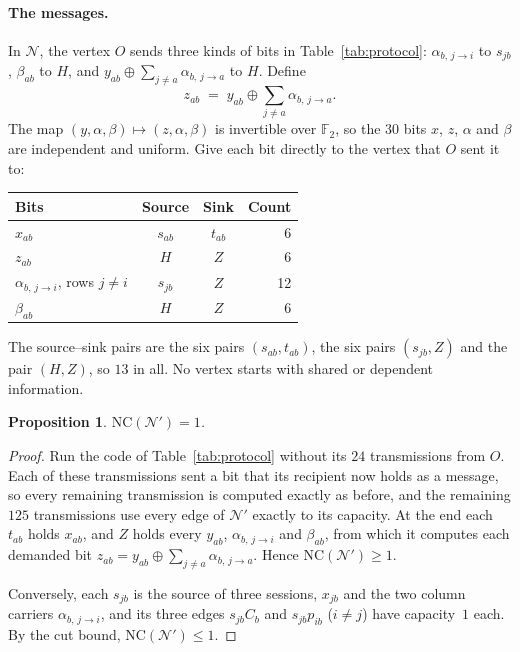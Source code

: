 \documentclass[11pt]{article}
\newtheorem{proposition}[theorem]{Proposition}
\newcommand{\NC}{\mathrm{NC}}
\newcommand{\F}{\mathbb{F}_2}
\newcommand{\al}[3]{\alpha_{#1,\,#2\to#3}}
\begin{document}
\paragraph{The messages.} In $\mathcal N$, the vertex $O$ sends three kinds of bits in Table~\ref{tab:protocol}: $\al{b}{j}{i}$ to $s_{jb}$, $\beta_{ab}$ to $H$, and $y_{ab}\oplus\sum_{j\neq a}\al{b}{j}{a}$ to $H$. Define
\[
z_{ab}\;=\;y_{ab}\oplus\sum_{j\neq a}\al{b}{j}{a}.
\]
The map $(y,\alpha,\beta)\mapsto(z,\alpha,\beta)$ is invertible over $\F$, so the $30$ bits $x$, $z$, $\alpha$ and $\beta$ are independent and uniform. Give each bit directly to the vertex that $O$ sent it to:
\begin{center}
\begin{tabular}{@{}l c c r@{}}
\toprule
Bits & Source & Sink & Count\\
\midrule
$x_{ab}$ & $s_{ab}$ & $t_{ab}$ & 6\\
$z_{ab}$ & $H$ & $Z$ & 6\\
$\al{b}{j}{i}$, rows $j\neq i$ & $s_{jb}$ & $Z$ & 12\\
$\beta_{ab}$ & $H$ & $Z$ & 6\\
\bottomrule
\end{tabular}
\end{center}
The source--sink pairs are the six pairs $(s_{ab},t_{ab})$, the six pairs $(s_{jb},Z)$ and the pair $(H,Z)$, so $13$ in all. No vertex starts with shared or dependent information.

\begin{proposition}\label{prop:code32}
$\NC(\mathcal N')=1$.
\end{proposition}

\begin{proof}
Run the code of Table~\ref{tab:protocol} without its $24$ transmissions from $O$. Each of these transmissions sent a bit that its recipient now holds as a message, so every remaining transmission is computed exactly as before, and the remaining $125$ transmissions use every edge of $\mathcal N'$ exactly to its capacity. At the end each $t_{ab}$ holds $x_{ab}$, and $Z$ holds every $y_{ab}$, $\al{b}{j}{i}$ and $\beta_{ab}$, from which it computes each demanded bit $z_{ab}=y_{ab}\oplus\sum_{j\neq a}\al{b}{j}{a}$. Hence $\NC(\mathcal N')\ge1$.

Conversely, each $s_{jb}$ is the source of three sessions, $x_{jb}$ and the two column carriers $\al{b}{j}{i}$, and its three edges $s_{jb}C_b$ and $s_{jb}p_{ib}$ ($i\neq j$) have capacity~$1$ each. By the cut bound, $\NC(\mathcal N')\le1$.
\end{proof}
\end{document}
